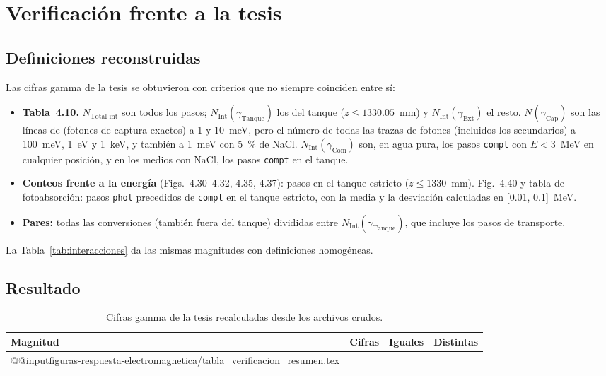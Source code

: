 \documentclass[11pt,a4paper]{article}
\newcommand{\tablas}{figuras-respuesta-electromagnetica}
\newcommand{\archivo}[1]{\texttt{\detokenize{#1}}}
\newcommand{\var}[1]{\texttt{#1}}
\begin{document}
\section{Verificación frente a la tesis}
\label{sec:verificacion}

\subsection{Definiciones reconstruidas}

Las cifras gamma de la tesis se obtuvieron con criterios que no siempre coinciden entre sí:
\begin{itemize}
  \item \textbf{Tabla~4.10.} $N_\mathrm{Total\text{-}int}$ son todos los pasos; $N_\mathrm{Int}(\gamma_\mathrm{Tanque})$ los del tanque ($z\le1330.05$~mm) y $N_\mathrm{Int}(\gamma_\mathrm{Ext})$ el resto. $N(\gamma_\mathrm{Cap})$ son las líneas de \archivo{gamma-primario} (fotones de captura exactos) a 1 y 10~meV, pero el número de todas las trazas de fotones (incluidos los secundarios) a 100~meV, 1~eV y 1~keV, y también a 1~meV con 5~\% de NaCl. $N_\mathrm{Int}(\gamma_\mathrm{Com})$ son, en agua pura, los pasos \var{compt} con $E<3$~MeV en cualquier posición, y en los medios con NaCl, los pasos \var{compt} en el tanque.
  \item \textbf{Conteos frente a la energía} (Figs.~4.30--4.32, 4.35, 4.37): pasos en el tanque estricto ($z\le1330$~mm). Fig.~4.40 y tabla de fotoabsorción: pasos \var{phot} precedidos de \var{compt} en el tanque estricto, con la media y la desviación calculadas en [0.01, 0.1]~MeV.
  \item \textbf{Pares:} todas las conversiones (también fuera del tanque) divididas entre $N_\mathrm{Int}(\gamma_\mathrm{Tanque})$, que incluye los pasos de transporte.
\end{itemize}
La Tabla~\ref{tab:interacciones} da las mismas magnitudes con definiciones homogéneas.

\subsection{Resultado}

\begin{table}[H]
\centering\small
\caption{Cifras gamma de la tesis recalculadas desde los archivos crudos.}
\label{tab:verif}
\begin{tabular}{@{}lrrr@{}}
\toprule
Magnitud & Cifras & Iguales & Distintas \\
\midrule
\csname @@input\endcsname \tablas/tabla_verificacion_resumen.tex
\bottomrule
\end{tabular}
\end{table}
\end{document}
